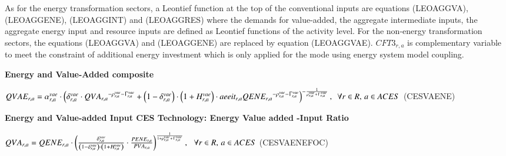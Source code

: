 \documentclass[10pt,a4paper,titlepage,dvipdfmx]{book}
\begin{document}
As for the energy transformation sectors, a Leontief function at the top of the conventional inputs are equations (LEOAGGVA), (LEOAGGENE), (LEOAGGINT) and (LEOAGGRES) where the demands for value-added, the aggregate intermediate inputs, the aggregate energy input and resource inputs are defined as Leontief functions of the activity level. For the non-energy transformation sectors, the equations (LEOAGGVA) and (LEOAGGENE) are replaced by equation (LEOAGGVAE). $CFT3_{r,a}$ is complementary variable to meet the constraint of additional energy investment which is only applied for the mode using energy system model coupling.

\begin{flushleft}\textbf{Energy and Value-Added composite}\end{flushleft}


\begin{center}  $QVAE_{r,a}=\alpha _{r,a}^{vae}\cdot \left(\delta _{r,a}^{vae}\cdot QV{A_{r,a}}^{-\rho _{r,a}^{vae}-\Upgamma _{r,a}^{vae}}+\left(1-\delta _{r,a}^{vae}\right)\cdot \left(1+H _{r,a}^{vae}\right)\cdot aeeit_{r,a}QEN{E_{r,a}}^{-\rho _{r,a}^{vae}-\Upgamma _{r,a}^{vae}}\right)^{-\frac{1}{\rho _{r,a}^{vae}+\Upgamma _{r,a}^{vae}}},\,\,\,\forall r\in R,\,a\in ACES$ (CESVAENE)
\end{center}

\begin{flushleft}\textbf{Energy and Value-added Input CES Technology: Energy \textendash{} Value added -Input Ratio}\end{flushleft}


\begin{center}  $QVA_{r,a}=QENE_{r,a}\cdot \left(\frac{\delta _{r,a}^{vae}}{\left(1-\delta _{r,a}^{vae}\right)\cdot \left(1+H _{r,a}^{vae}\right)}\cdot \frac{PENE_{r,a}}{PVA_{r,a}}\right)^{\frac{1}{1+\rho _{r,a}^{vae}+\Upgamma _{r,a}^{vae}}},\,\,\,\,\forall r\in R,\,a\in ACES$ (CESVAENEFOC)
\end{center}
\end{document}
